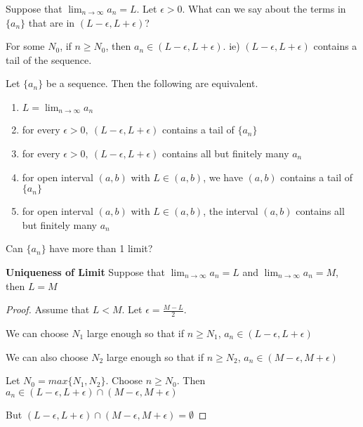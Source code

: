 \begin{note}
Suppose that $\lim_{n\to \infty} a_n = L$. Let $\epsilon > 0$. What can we say about the terms in $\{a_n\}$ that are in $(L-\epsilon ,L+\epsilon)$?

For some $N_0$, if $n\geq N_0$, then $a_n \in (L-\epsilon ,L+\epsilon)$. ie) $(L-\epsilon ,L+\epsilon)$ contains a tail of the sequence.

\end{note}

\begin{prop}
Let $\{a_n\}$ be a sequence. Then the following are equivalent.
\begin{enumerate}
\item $L = \lim_{n\to \infty} a_n$
\item for every $ \epsilon > 0 ,\  (L-\epsilon ,L+\epsilon) $ contains a tail of $\{a_n\}$
\item for every $\epsilon > 0 ,\ (L-\epsilon ,L+\epsilon) $ contains all but finitely many $a_n$
\item for open interval $(a,b)$ with $L\in (a,b)$, we have $(a,b)$ contains a tail of $\{a_n\}$
\item for open interval $(a,b)$ with $L\in (a,b)$, the interval $(a,b)$ contains all but finitely many $a_n$
\end{enumerate}
\end{prop}

\begin{ques}
Can $\{a_n\}$ have more than 1 limit?
\end{ques}

\begin{thm} \textbf{Uniqueness of Limit}
Suppose that $\lim_{n\to \infty} a_n = L$ and $\lim_{n\to \infty} a_n = M$, then $L = M$
\end{thm}
\begin{proof}
Assume that $L<M$. Let $\epsilon = \frac{M-L}{2}$.

We can choose $N_1$ large enough so that if $n \geq N_1$, $a_n \in (L-\epsilon ,L+\epsilon)$

We can also choose $N_2$ large enough so that if $n \geq N_2$, $a_n \in (M-\epsilon ,M+\epsilon)$

Let $N_0 = max \{N_1, N_2\}$. Choose $n \geq N_0$. Then $a_n \in (L-\epsilon ,L+\epsilon) \cap (M-\epsilon ,M+\epsilon)$

But $(L-\epsilon ,L+\epsilon) \cap (M-\epsilon ,M+\epsilon) = \emptyset$

\end{proof}












